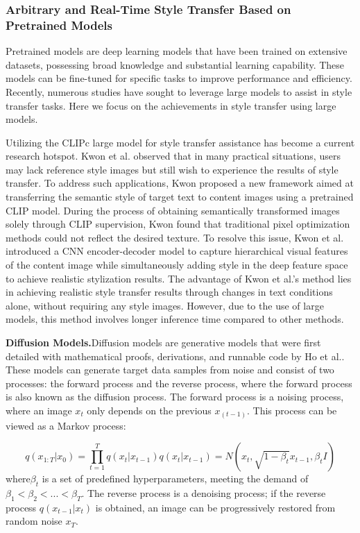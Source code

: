 \subsubsection{Arbitrary and Real-Time Style Transfer Based on Pretrained Models}

Pretrained models are deep learning models that have been trained on extensive datasets, possessing broad knowledge and substantial learning capability. These models can be fine-tuned for specific tasks to improve performance and efficiency. Recently, numerous studies have sought to leverage large models to assist in style transfer tasks. Here we focus on the achievements in style transfer using large models.

Utilizing the CLIPc\citep{56radford2021learning} large model for style transfer assistance has become a current research hotspot. Kwon et al.\citep{57kwon2022clipstyler} observed that in many practical situations, users may lack reference style images but still wish to experience the results of style transfer. To address such applications, Kwon proposed a new framework aimed at transferring the semantic style of target text to content images using a pretrained CLIP model. During the process of obtaining semantically transformed images solely through CLIP supervision, Kwon found that traditional pixel optimization methods could not reflect the desired texture. To resolve this issue, Kwon et al. introduced a CNN encoder-decoder model to capture hierarchical visual features of the content image while simultaneously adding style in the deep feature space to achieve realistic stylization results. The advantage of Kwon et al.'s method lies in achieving realistic style transfer results through changes in text conditions alone, without requiring any style images. However, due to the use of large models, this method involves longer inference time compared to other methods.

\textbf{Diffusion Models.}\quad Diffusion models are generative models that were first detailed with mathematical proofs, derivations, and runnable code by Ho et al.\citep{58ho2020denoising}. These models can generate target data samples from noise and consist of two processes: the forward process and the reverse process, where the forward process is also known as the diffusion process. The forward process is a noising process, where an image $x_t$ only depends on the previous $x_(t-1)$. This process can be viewed as a Markov process:

\begin{equation}
    q (x_ {1:T}|x_0) = \prod_ {t = 1}^ {T}q (x_t|x_ {t-1}) q (x_t|x_ {t-1}) = N (x_t, \sqrt {1-\beta_t}x_ {t-1},\beta_t I)
\end{equation} 
where$\beta_t$ is a set of predefined hyperparameters, meeting the demand of  $\beta_1<\beta_2<...<\beta_T$. The reverse process is a denoising process; if the reverse process $ q (x_ {t-1}|x_ {t})$ is obtained, an image can be progressively restored from random noise $x_T$.

